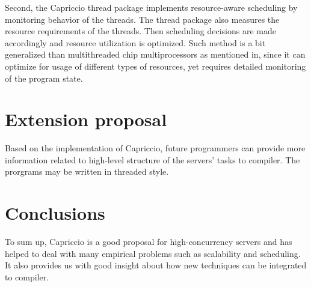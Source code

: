 \documentclass[10pt, letterpaper]{article}
\begin{document}
Second, the Capriccio thread package implements resource-aware scheduling by monitoring behavior of the threads.
The thread package also measures the resource requirements of the threads. Then scheduling decisions are made
accordingly and resource utilization is optimized. Such method is a bit generalized than multithreaded chip
multiprocessors as mentioned in\cite{seltzer2005performance}, since it can optimize for usage of different types of resources, yet
requires detailed monitoring of the program state.

\section{Extension proposal}
Based on the implementation of Capriccio, future programmers can provide more information related to high-level
structure of the servers' tasks to compiler. The prorgrams may be written in threaded style.
\cite{von2003capriccio}

\section{Conclusions}
To sum up, Capriccio is a good proposal for high-concurrency servers and has helped to deal with many empirical
problems such as scalability and scheduling. It also provides us with good insight about how new techniques can
be integrated to compiler.



\end{document}
